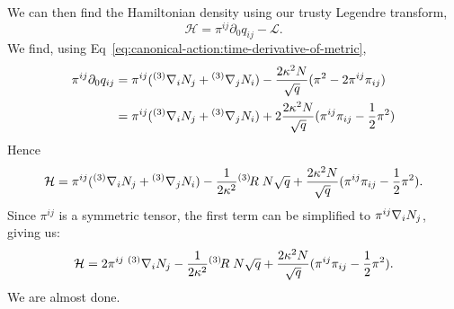 
We can then find the Hamiltonian density using our trusty Legendre transform,
\begin{equation}
\mathcal{H} = \pi^{ij}\partial_{0}q_{ij} - \mathcal{L}.
\end{equation}
We find, using Eq~\eqref{eq:canonical-action:time-derivative-of-metric},
\begin{equation}
  \begin{split}
  \pi^{ij}\partial_{0}q_{ij}
  &= \pi^{ij}({}^{(3)}\nabla_{i}N_{j} + {}^{(3)}\nabla_{j}N_{i}) - \frac{2\kappa^{2}N}{\sqrt{q}}(\pi^{2} - 2\pi^{ij}\pi_{ij})\\
&= \pi^{ij}({}^{(3)}\nabla_{i}N_{j} + {}^{(3)}\nabla_{j}N_{i}) + 2\frac{2\kappa^{2}N}{\sqrt{q}}(\pi^{ij}\pi_{ij}-\frac{1}{2}\pi^{2})
  \end{split}
\end{equation}
Hence
\begin{equation}
  \mathcal{H} = \pi^{ij}({}^{(3)}\nabla_{i}N_{j} + {}^{(3)}\nabla_{j}N_{i})
          - \frac{1}{2\kappa^{2}}{{}^{(3)}\!}R\; N\sqrt{q} + \frac{2\kappa^{2}N}{\sqrt{q}}(\pi^{ij}\pi_{ij}-\frac{1}{2}\pi^{2}).
\end{equation}
Since $\pi^{ij}$ is a symmetric tensor, the first term can be simplified
to $\pi^{ij}\nabla_{i}N_{j}$, giving us:
\begin{equation}
  \mathcal{H} = 2\pi^{ij}\;{{}^{(3)}\nabla_{i}}N_{j}
          - \frac{1}{2\kappa^{2}}{{}^{(3)}\!}R\; N\sqrt{q} + \frac{2\kappa^{2}N}{\sqrt{q}}(\pi^{ij}\pi_{ij}-\frac{1}{2}\pi^{2}).
\end{equation}
We are almost done.

